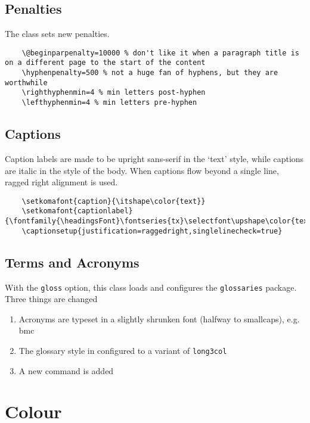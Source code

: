 \documentclass[solid,math,chem,code,plot,gloss]{bmc}
\begin{document}
\subsection{Penalties}
The class sets new penalties.
\begin{verbatim}
    \@beginparpenalty=10000 % don't like it when a paragraph title is on a different page to the start of the content
    \hyphenpenalty=500 % not a huge fan of hyphens, but they are worthwhile
    \righthyphenmin=4 % min letters post-hyphen
    \lefthyphenmin=4 % min letters pre-hyphen
\end{verbatim}

\subsection{Captions}
Caption labels are made to be upright sans-serif in the `text' style,
while captions are italic in the style of the body.
When captions flow beyond a single line, ragged right alignment is used.

\begin{verbatim}
    \setkomafont{caption}{\itshape\color{text}}
    \setkomafont{captionlabel}{\fontfamily{\headingsFont}\fontseries{tx}\selectfont\upshape\color{text}}
    \captionsetup{justification=raggedright,singlelinecheck=true}
\end{verbatim}

\subsection{Terms and Acronyms}
With the \texttt{gloss} option, this class loads and configures the
\texttt{glossaries} package. Three things are changed
\begin{enumerate}
    \item Acronyms are typeset in a slightly shrunken font (halfway to smallcaps), e.g. \acrshort{bmc}
    \item The glossary style in configured to a variant of \texttt{long3col}
    \item A new command \texttt{} is added
\end{enumerate}

\section{Colour}
\end{document}
